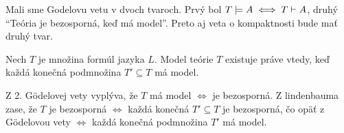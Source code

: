 \stopFIXME

Mali sme Godelovu vetu v dvoch tvaroch. Prvý bol
$ T \models A \iff T \vdash A$, druhý ``Teória je bezosporná, keď
má model''. Preto aj veta o kompaktnosti bude mať druhý tvar.

\begin{veta}
    Nech $T$ je množina formúl jazyka $L$. 
    Model teórie $T$ existuje práve vtedy, keď každá konečná podmnožina
    $T' \subseteq T$ má model.
\end{veta}

\begin{dokaz}
    Z 2. G\"odelovej vety vyplýva, že $T$ má model $\iff$ je bezosporná.
    Z lindenbauma zase, že $T$ je bezosporná $\iff$ každá konečná
    $T' \subseteq T$ je bezosporná, čo opäť z G\"odelovou vety
    $\iff$ každá konečná podmnožina $T'$ má model.
\end{dokaz}

